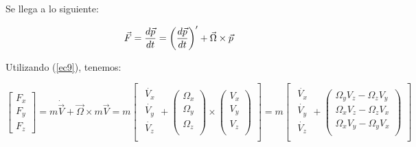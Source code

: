 	Se llega a lo siguiente:

		\begin{equation}
		\vec{F} = {d\vec{p}\over dt} = \left({d\vec{p}\over dt} \right)^{\prime} + \vec{\Omega} \times \vec{p}
		\label{ec11}
		\end{equation} %

	Utilizando (\ref{ec9}), tenemos:

		\begin{equation}
		\begin{bmatrix}
  		F_{x}\\
  		F_{y}\\
  		F_{z}
  		\end{bmatrix} =
  		m \dot{\vec{V}} + \vec{\Omega} \times m \vec{V} =
  		m \begin{bmatrix}
  		\begin{matrix}
  		\dot{V_{x}}\\
  		\dot{V_{y}}\\
  		\dot{V_{z}}\\
  		\end{matrix}
		+
		\begin{pmatrix}
        \Omega_{x}\\
        \Omega_{y}\\
        \Omega_{z}\\
		\end{pmatrix}
    	\times
		\begin{pmatrix}
        V_{x}\\
        V_{y}\\
        V_{z}\\
   		\end{pmatrix}
  		\end{bmatrix}
  		=
  		m \begin{bmatrix}
  		\begin{matrix}
  		\dot{V_{x}}\\
  		\dot{V_{y}}\\
  		\dot{V_{z}}\\
  		\end{matrix}
		+
		\begin{pmatrix}
        \Omega_{y}V_{z}-\Omega_{z}V_{y}\\
        \Omega_{x}V_{z}-\Omega_{z}V_{x}\\
        \Omega_{x}V_{y}-\Omega_{y}V_{x}\\
   		\end{pmatrix}
  		\end{bmatrix}
		\label{ec12}
		\end{equation} %

